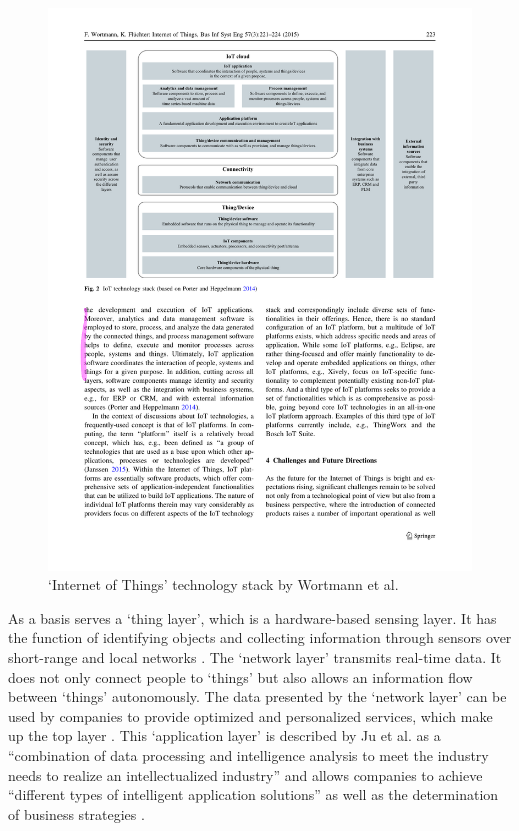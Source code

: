 	\begin{figure}[ht]
	    \begin{center}
	    \includegraphics[scale=1.15]{Talk11/wortmann_stack.pdf}
	    \end{center}
	    \caption{`Internet of Things' technology stack by Wortmann et al. \cite{wortmann}}
	    \label{fig:wortmann_stack}
    \end{figure}
	As a basis serves a `thing layer', which is a hardware-based sensing layer. It has the function of identifying objects and collecting information through sensors over short-range and local networks \cite{ju}. The `network layer' transmits real-time data. It does not only connect people to `things' but also allows an information flow between `things' autonomously. The data presented by the `network layer' can be used by companies to provide optimized and personalized services, which make up the top layer \cite{ju}. This `application layer' is described by Ju et al. as a ``combination of data processing and intelligence analysis to meet the industry needs to realize an intellectualized industry'' \cite{ju} and allows companies to achieve ``different types of intelligent application solutions'' as well as the determination of business strategies \cite{ju}.\\
